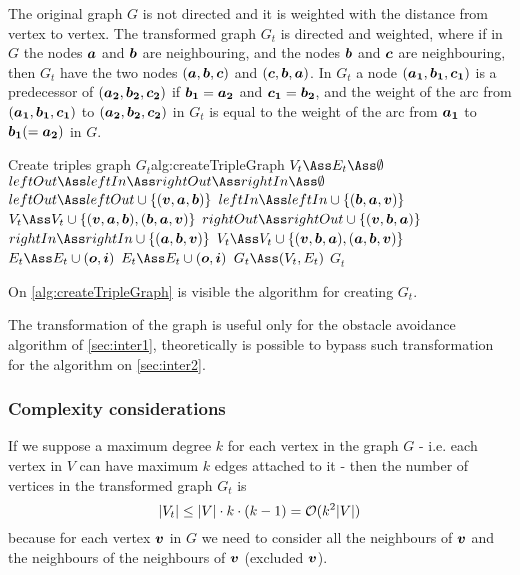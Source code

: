 \documentclass[dissertation.tex]{subfiles}
\begin{document}
The original graph $G$ is not directed and it is weighted
with the distance from vertex to vertex. The transformed graph $G_t$ is
directed and weighted, where if in $G$ the nodes $\boldsymbol{a}$
and $\boldsymbol{b}$ are
neighbouring, and the nodes $\boldsymbol{b}$ and $\boldsymbol{c}$ are neighbouring, then $G_t$
have the two nodes $(\boldsymbol{a},\boldsymbol{b},\boldsymbol{c})$ and $(\boldsymbol{c},\boldsymbol{b},\boldsymbol{a})$. In
$G_t$ a node $(\boldsymbol{a_1},\boldsymbol{b_1},\boldsymbol{c_1})$ is a predecessor of
$(\boldsymbol{a_2},\boldsymbol{b_2},\boldsymbol{c_2})$ if $\boldsymbol{b_1}=\boldsymbol{a_2}$ and $\boldsymbol{c_1}=\boldsymbol{b_2}$, and the weight of the arc
from $(\boldsymbol{a_1},\boldsymbol{b_1},\boldsymbol{c_1})$ to $(\boldsymbol{a_2},\boldsymbol{b_2},\boldsymbol{c_2})$ in $G_t$ is
equal to
the weight of the arc from $\boldsymbol{a_1}$ to $\boldsymbol{b_1}(=\boldsymbol{a_2})$ in $G$.

\begin{algo}{Create triples graph $G_t$}{alg:createTripleGraph}
  \State $V_t\Ass E_t\Ass \emptyset$
  \label{ln:tripleFor0}
  \State $leftOut\Ass leftIn\Ass rightOut\Ass rightIn\Ass \emptyset$
  \State $leftOut \Ass leftOut\cup \{(\ve{v},\ve{a},\ve{b})\}$
  \State $leftIn \Ass leftIn\cup \{(\ve{b},\ve{a},\ve{v})\}$
  \State $V_t \Ass V_t\cup \{(\ve{v},\ve{a},\ve{b}), (\ve{b},\ve{a},\ve{v})\}$
  \EndFor
  \State $rightOut \Ass rightOut\cup \{(\ve{v},\ve{b},\ve{a})\}$
  \State $rightIn \Ass rightIn\cup \{(\ve{a},\ve{b},\ve{v})\}$
  \State $V_t \Ass V_t\cup \{(\ve{v},\ve{b},\ve{a}), (\ve{a},\ve{b},\ve{v})\}$
  \EndFor
  \State $E_t \Ass E_t\cup (\ve{o},\ve{i})$
  \EndFor
  \EndFor
  \label{ln:tripleFor1}
  \label{ln:tripleFor2}
  \State $E_t \Ass E_t\cup (\ve{o},\ve{i})$
  \EndFor
  \EndFor
  \EndFor
  \State $G_t\Ass(V_t,E_t)$
  \State\Return $G_t$
  \EndFunction
\end{algo}
On \cref{alg:createTripleGraph} is visible the algorithm for creating
$G_t$.

The transformation of the graph is useful only for the obstacle
avoidance algorithm of
\cref{sec:inter1}, theoretically is possible to bypass such
transformation for the algorithm on \cref{sec:inter2}.

\subsubsection{Complexity considerations}
If we suppose a maximum degree $k$ for each vertex in the graph $G$ -
i.e. each vertex in $V$ can have maximum $k$ edges attached to
it - then the number of vertices in the transformed graph $G_t$ is 
\begin{equation}
  \label{eq:numTriples}
  |V_t|\leq |V|\cdot k\cdot(k-1)=\mathcal{O}(k^2|V|)
\end{equation}
because for each vertex $\boldsymbol{v}$ in $G$ we need to
consider all the neighbours of $\boldsymbol{v}$ and the neighbours of the neighbours
of $\boldsymbol{v}$ (excluded $\boldsymbol{v}$).
\end{document}
